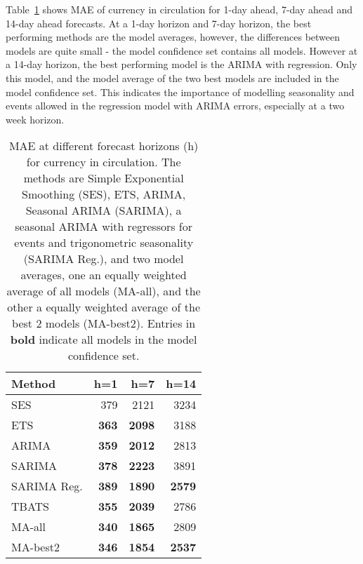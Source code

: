 



Table~\ref{tab:cicsum} shows MAE of currency in circulation for 1-day ahead, 7-day ahead and 14-day ahead forecasts. At a 1-day horizon and 7-day horizon, the best performing methods are the model averages, however, the differences between models are quite small - the model confidence set contains all models. However at a 14-day horizon, the best performing model is the ARIMA with regression. Only this model, and the model average of the two best models are included in the model confidence set. This indicates the importance of modelling seasonality and events allowed in the regression model with ARIMA errors, especially at a two week horizon.

\begin{table}[!ht]
\centering
\begin{tabular}{lrrr}
  \hline
Method & h=1 & h=7 & h=14 \\ 
  \hline
SES & 379 & 2121 & 3234 \\ 
  ETS & \textbf{363} & \textbf{2098} & 3188 \\ 
  ARIMA & \textbf{359} & \textbf{2012} & 2813 \\ 
  SARIMA & \textbf{378} & \textbf{2223} & 3891 \\ 
  SARIMA Reg. & \textbf{389} & \textbf{1890} & \textbf{2579} \\ 
  TBATS & \textbf{355} & \textbf{2039} & 2786 \\ 
  MA-all & \textbf{340} & \textbf{1865} & 2809 \\ 
  MA-best2 & \textbf{346} & \textbf{1854} & \textbf{2537} \\ 
   \hline
\end{tabular}
\caption{MAE at different forecast horizons (h) for currency in circulation. The methods are Simple Exponential Smoothing (SES), ETS, ARIMA, Seasonal ARIMA (SARIMA), a seasonal ARIMA with regressors for events and trigonometric seasonality (SARIMA Reg.), and two model averages, one an equally weighted average of all models (MA-all), and the other a equally weighted average of the best 2 models (MA-best2). Entries in \textbf{bold} indicate all models in the model confidence set.} 
\label{tab:cicsum}
\end{table}

